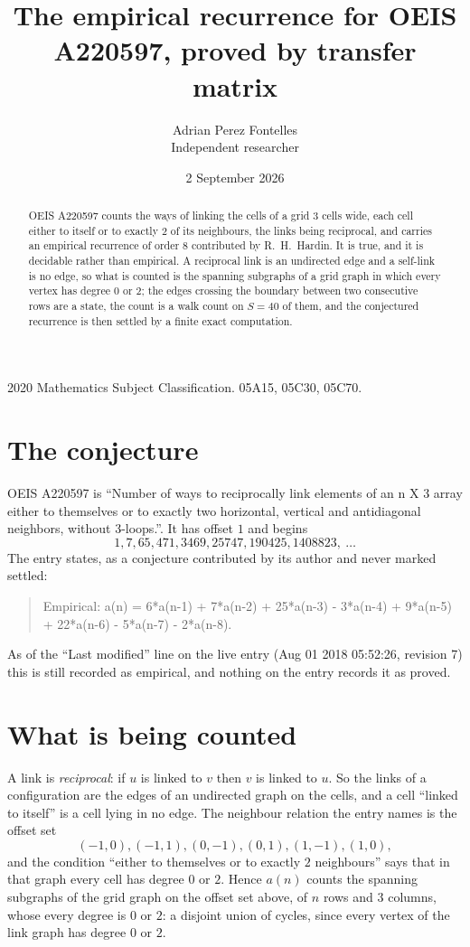 \documentclass[11pt,a4paper]{article}
\title{The empirical recurrence for OEIS A220597, proved by transfer matrix}
\author{Adrian Perez Fontelles\\ \small Independent researcher}
\date{2 September 2026}
\theoremstyle{plain}
\theoremstyle{definition}
\begin{document}
\maketitle

\begin{abstract}
OEIS A220597 counts the ways of linking the cells of a grid $3$ cells wide, each cell either to
itself or to exactly $2$ of its neighbours, the links being reciprocal, and carries an
empirical recurrence of order $8$ contributed by R.~H.~Hardin. It is true, and it is
decidable rather than empirical. A reciprocal link is an undirected edge and a self-link is
no edge, so what is counted is the spanning subgraphs of a grid graph in which every vertex
has degree $0$ or $2$; the edges crossing the boundary between two consecutive rows are a
state, the count is a walk count on $S=40$ of them, and the conjectured recurrence is then
settled by a finite exact computation.
\end{abstract}

\noindent\small 2020 Mathematics Subject Classification. 05A15, 05C30, 05C70.\normalsize

\section{The conjecture}

OEIS A220597 is ``Number of ways to reciprocally link elements of an n X 3 array either to themselves or to exactly two horizontal, vertical and antidiagonal neighbors, without 3-loops.''. It has offset $1$ and begins
\[
1, 7, 65, 471, 3469, 25747, 190425, 1408823,\ \dots
\]
The entry states, as a conjecture contributed by its author and never marked settled:
\begin{quote}
Empirical: a(n) = 6*a(n-1) + 7*a(n-2) + 25*a(n-3) - 3*a(n-4) + 9*a(n-5) + 22*a(n-6) - 5*a(n-7) - 2*a(n-8).
\end{quote}
As of the ``Last modified'' line on the live entry (Aug 01 2018 05:52:26, revision 7) this is still
recorded as empirical, and nothing on the entry records it as proved.

\section{What is being counted}

A link is \emph{reciprocal}: if $u$ is linked to $v$ then $v$ is linked to $u$. So the links
of a configuration are the edges of an undirected graph on the cells, and a cell ``linked to
itself'' is a cell lying in no edge. The neighbour relation the entry names is the offset set
\[
(-1,0), (-1,1), (0,-1), (0,1), (1,-1), (1,0),
\]
and the condition ``either to themselves or to exactly $2$ neighbours'' says that in that
graph every cell has degree $0$ or $2$. Hence $a(n)$ counts the spanning subgraphs of the
grid graph on the offset set above, of $n$ rows and $3$ columns,
whose every degree is $0$ or $2$: a disjoint union of cycles, since every vertex of the link graph has degree $0$ or $2$.
\end{document}
